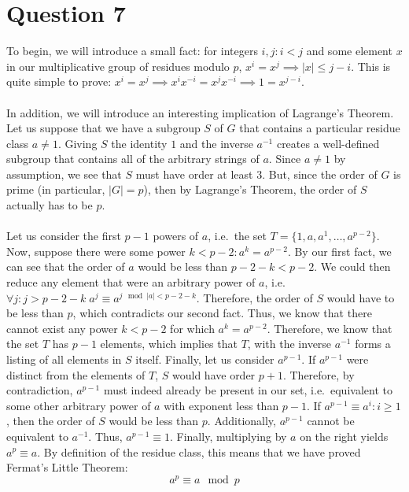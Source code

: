 \documentclass[letterpaper]{article}
\begin{document}
\section{Question 7}
\label{sec:Question7}
To begin, we will introduce a small fact: for integers $ i, j : i < j $ and some element $ x $ in our multiplicative group of residues modulo $ p $, $ x^i = x^j \implies |x| \leq j - i $.
This is quite simple to prove: $ x^i = x^j \implies x^i x^{-i} = x^j x^{-i} \implies 1 = x^{j - i} $.
\\ \\
In addition, we will introduce an interesting implication of Lagrange's Theorem.
Let us suppose that we have a subgroup $ S $ of $ G $ that contains a particular residue class $ a \neq 1 $.
Giving $ S $ the identity $ 1 $ and the inverse $ a^{-1} $ creates a well-defined subgroup that contains all of the arbitrary strings of $ a $.
Since $ a \neq 1 $ by assumption, we see that $ S $ must have order at least $ 3 $.
But, since the order of $ G $ is prime (in particular, $ |G| = p $), then by Lagrange's Theorem, the order of $ S $ actually has to be $ p $.
\\ \\
Let us consider the first $ p - 1 $ powers of $ a $, i.e.\ the set $ T = \{1, a, a^1, \ldots, a^{p - 2}\} $.
Now, suppose there were some power $ k < p - 2 : a^k = a^{p - 2}$.
By our first fact, we can see that the order of $ a $ would be less than $ p - 2 - k < p - 2 $.
We could then reduce any element that were an arbitrary power of $ a $, i.e. $ \forall j : j > p - 2 - k \; a^j \equiv a^{j \mod{|a| < p - 2 - k}} $.
Therefore, the order of $ S $ would have to be less than $ p $, which contradicts our second fact.
Thus, we know that there cannot exist any power $ k < p - 2 $ for which $ a^k = a^{p - 2} $.
Therefore, we know that the set $ T $ has $ p - 1 $ elements, which implies that $ T $, with the inverse $ a^{-1} $ forms a listing of all elements in $ S $ itself.
Finally, let us consider $ a^{p - 1} $.
If $ a^{p - 1} $ were distinct from the elements of $ T $, $ S $ would have order $ p + 1 $.
Therefore, by contradiction, $ a^{p - 1} $ must indeed already be present in our set, i.e.\ equivalent to some other arbitrary power of $ a $ with exponent less than $ p - 1 $.
If $ a^{p - 1} \equiv a^i : i \geq 1 $, then the order of $ S $ would be less than $ p $.
Additionally, $ a^{p - 1} $ cannot be equivalent to $ a^{-1} $.
Thus, $ a^{p - 1} \equiv 1 $.
Finally, multiplying by $ a $ on the right yields $ a^p \equiv a $.
By definition of the residue class, this means that we have proved Fermat's Little Theorem:
$$ a^p \equiv a \mod{p} $$
\end{document}
